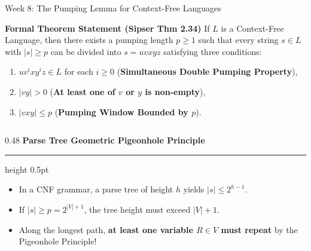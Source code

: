 \documentclass[aspectratio=169, 10pt]{beamer}
\newcommand{\colheader}[1]{%
  {\noindent\footnotesize\bfseries\color{gimpanavy}#1}%
  \vspace{0.03cm}%
  {\color{gimpanavy!30}\hrule height 0.5pt}%
  \vspace{0.08cm}%
}
\begin{document}
\begin{frame}{Week 8: The Pumping Lemma for Context-Free Languages}
  \begin{tcolorbox}[conceptcard]
    {\bfseries\footnotesize\color{gimpanavy} Formal Theorem Statement (Sipser Thm 2.34)}
    \vspace{0.04cm}
    \footnotesize
    If $L$ is a Context-Free Language, then there exists a pumping length $p \ge 1$ such that every string $s \in L$ with $|s| \ge p$ can be divided into $s = uvxyz$ satisfying three conditions:
    \begin{enumerate}\setlength{\itemsep}{1pt}
      \item $u v^i x y^i z \in L$ for each $i \ge 0$ \quad (\textbf{Simultaneous Double Pumping Property}),
      \item $|vy| > 0$ \quad (\textbf{At least one of $v$ or $y$ is non-empty}),
      \item $|vxy| \le p$ \quad (\textbf{Pumping Window Bounded by $p$}).
    \end{enumerate}
  \end{tcolorbox}

  \vspace{0.06cm}
  \begin{columns}[T, onlytextwidth]
    \begin{column}{0.48\textwidth}
      \colheader{Parse Tree Geometric Pigeonhole Principle}
      \begin{tcolorbox}[examplecard, top=3pt, bottom=3pt]
        \begin{itemize}\setlength{\itemsep}{2pt}\scriptsize
          \item In a CNF grammar, a parse tree of height $h$ yields $|s| \le 2^{h-1}$.
          \item If $|s| \ge p = 2^{|V| + 1}$, the tree height must exceed $|V| + 1$.
          \item Along the longest path, \textbf{at least one variable $R \in V$ must repeat} by the Pigeonhole Principle!
        \end{itemize}
      \end{tcolorbox}
    \end{column}

    \hfill


\end{columns}
\end{frame}
\end{document}
